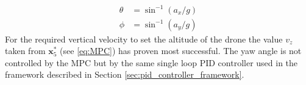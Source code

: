 \begin{align}
\theta &= \sin^{-1}(a_{x} / g)\\
\phi &= \sin^{-1}(a_{y} / g)
\end{align}
For the required vertical velocity to set the altitude of the drone the value $v_{z}$ taken from $\mathbf{x}_5^*$ (see \eqref{eq:MPC}) has proven most successful. The yaw angle is not controlled by the MPC but by the same single loop PID controller used in the framework described in Section \ref{sec:pid_controller_framework}.
